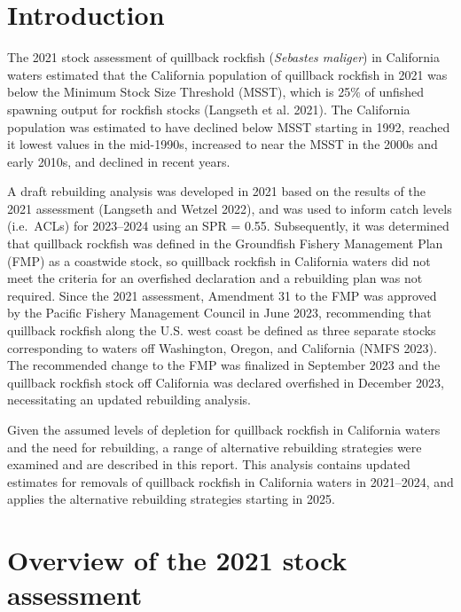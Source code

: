 \documentclass[11pt,
  letterpaper,
]{article}
\begin{document}
\hypertarget{introduction}{%
\section{Introduction}\label{introduction}}

The 2021 stock assessment of quillback rockfish (\emph{Sebastes maliger}) in California waters estimated that the California population of quillback rockfish in 2021 was below the Minimum Stock Size Threshold (MSST), which is 25\(\%\) of unfished spawning output for rockfish stocks (Langseth et al. 2021). The California population was estimated to have declined below MSST starting in 1992, reached it lowest values in the mid-1990s, increased to near the MSST in the 2000s and early 2010s, and declined in recent years.

A draft rebuilding analysis was developed in 2021 based on the results of the 2021 assessment (Langseth and Wetzel 2022), and was used to inform catch levels (i.e.~ACLs) for 2023--2024 using an SPR = 0.55. Subsequently, it was determined that quillback rockfish was defined in the Groundfish Fishery Management Plan (FMP) as a coastwide stock, so quillback rockfish in California waters did not meet the criteria for an overfished declaration and a rebuilding plan was not required. Since the 2021 assessment, Amendment 31 to the FMP was approved by the Pacific Fishery Management Council in June 2023, recommending that quillback rockfish along the U.S. west coast be defined as three separate stocks corresponding to waters off Washington, Oregon, and California (NMFS 2023). The recommended change to the FMP was finalized in September 2023 and the quillback rockfish stock off California was declared overfished in December 2023, necessitating an updated rebuilding analysis.

Given the assumed levels of depletion for quillback rockfish in California waters and the need for rebuilding, a range of alternative rebuilding strategies were examined and are described in this report. This analysis contains updated estimates for removals of quillback rockfish in California waters in 2021--2024, and applies the alternative rebuilding strategies starting in 2025.

\hypertarget{overview-of-the-2021-stock-assessment}{%
\section{Overview of the 2021 stock assessment}\label{overview-of-the-2021-stock-assessment}}
\end{document}
